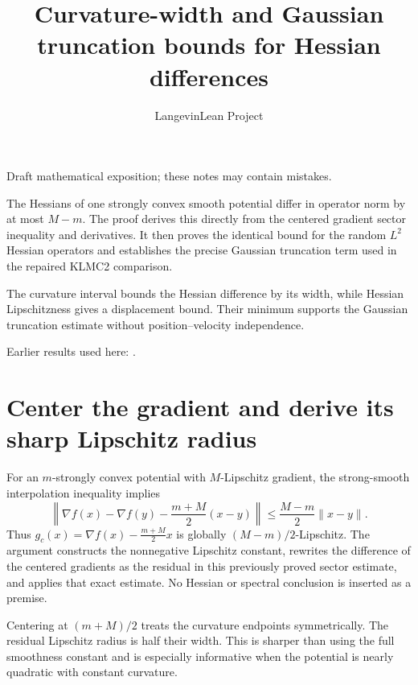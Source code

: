 \documentclass[11pt,a4paper]{article}
\title{\texorpdfstring{Curvature-width and Gaussian truncation bounds for Hessian differences}{Curvature-width and Gaussian truncation bounds for Hessian differences}}
\author{LangevinLean Project}
\date{}
\begin{document}
\maketitle
Draft mathematical exposition; these notes may contain mistakes.


The Hessians of one strongly convex smooth potential differ in operator norm by at most \(M-m\). The proof derives this directly from the centered gradient sector inequality and derivatives. It then proves the identical bound for the random \(L^{2}\) Hessian operators and establishes the precise Gaussian truncation term used in the repaired KLMC2 comparison.



The curvature interval bounds the Hessian difference by its width, while Hessian Lipschitzness gives a displacement bound. Their minimum supports the Gaussian truncation estimate without position–velocity independence.



Earlier results used here: \cite[Section~3.10]{LangevinLean2026ULASC}.

\section{\texorpdfstring{Center the gradient and derive its sharp Lipschitz radius}{Center the gradient and derive its sharp Lipschitz radius}}


For an \(m\)-strongly convex potential with \(M\)-Lipschitz gradient, the strong-smooth interpolation inequality implies \[\left\|\nabla f(x)-\nabla f(y)-\frac{m+M}{2}(x-y)\right\|\le\frac{M-m}{2}\|x-y\|.\] Thus \(g_c(x)=\nabla f(x)-\frac{m+M}{2}x\) is globally \((M-m)/2\)-Lipschitz. The argument constructs the nonnegative Lipschitz constant, rewrites the difference of the centered gradients as the residual in this previously proved sector estimate, and applies that exact estimate. No Hessian or spectral conclusion is inserted as a premise.



Centering at \((m+M)/2\) treats the curvature endpoints symmetrically. The residual Lipschitz radius is half their width. This is sharper than using the full smoothness constant and is especially informative when the potential is nearly quadratic with constant curvature.
\end{document}
